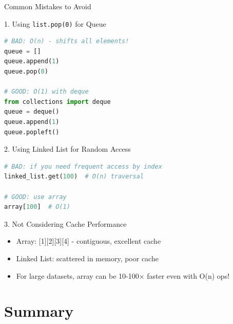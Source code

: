 \documentclass[aspectratio=169,xcolor=dvipsnames]{beamer}
\begin{document}
\begin{frame}[fragile]{Common Mistakes to Avoid}
  \begin{alertblock}{1. Using \texttt{list.pop(0)} for Queue}
    \begin{lstlisting}[language=Python,basicstyle=\tiny\ttfamily]
# BAD: O(n) - shifts all elements!
queue = []
queue.append(1)
queue.pop(0)

# GOOD: O(1) with deque
from collections import deque
queue = deque()
queue.append(1)
queue.popleft()
    \end{lstlisting}
  \end{alertblock}

  \begin{alertblock}{2. Using Linked List for Random Access}
    \begin{lstlisting}[language=Python,basicstyle=\tiny\ttfamily]
# BAD: if you need frequent access by index
linked_list.get(100)  # O(n) traversal

# GOOD: use array
array[100]  # O(1)
    \end{lstlisting}
  \end{alertblock}

  \begin{alertblock}{3. Not Considering Cache Performance}
    \begin{itemize}
      \item Array: [1][2][3][4] - contiguous, excellent cache
      \item Linked List: scattered in memory, poor cache
      \item For large datasets, array can be 10-100× faster even with O(n) ops!
    \end{itemize}
  \end{alertblock}
\end{frame}

\section{Summary}
\end{document}
